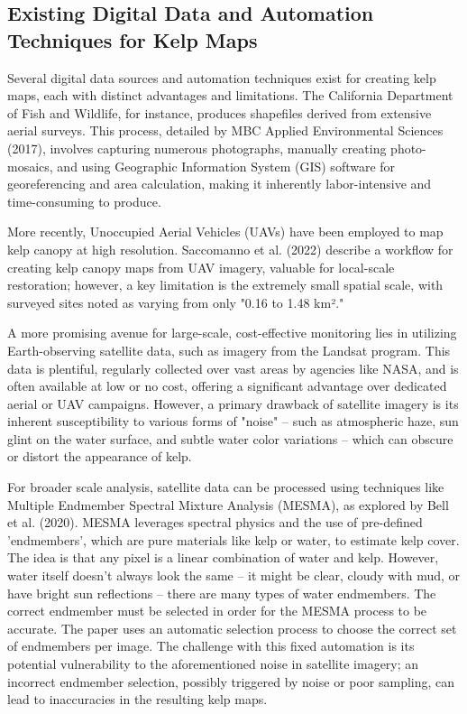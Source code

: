 \documentclass{article}
\begin{document}
\subsection{Existing Digital Data and Automation Techniques for Kelp Maps} 

Several digital data sources and automation techniques exist for creating kelp maps, each with distinct advantages and limitations. The California Department of Fish and Wildlife, for instance, produces shapefiles derived from extensive aerial surveys. This process, detailed by MBC Applied Environmental Sciences (2017), involves capturing numerous photographs, manually creating photo-mosaics, and  using Geographic Information System (GIS) software for georeferencing and area calculation, making it inherently labor-intensive and time-consuming to produce.

More recently, Unoccupied Aerial Vehicles (UAVs) have been employed to map kelp canopy at high resolution. Saccomanno et al. (2022) describe a workflow for creating kelp canopy maps from UAV imagery, valuable for local-scale restoration; however, a key limitation is the extremely small spatial scale, with surveyed sites noted as varying from only "0.16 to 1.48 km²."

A more promising avenue for large-scale, cost-effective monitoring lies in utilizing Earth-observing satellite data, such as imagery from the Landsat program. This data is plentiful, regularly collected over vast areas by agencies like NASA, and is often available at low or no cost, offering a significant advantage over dedicated aerial or UAV campaigns. However, a primary drawback of satellite imagery is its inherent susceptibility to various forms of "noise" – such as atmospheric haze, sun glint on the water surface, and subtle water color variations – which can obscure or distort the appearance of kelp. 

For broader scale analysis, satellite data can be processed using techniques like Multiple Endmember Spectral Mixture Analysis (MESMA), as explored by Bell et al. (2020). MESMA leverages spectral physics and the use of pre-defined 'endmembers', which are pure materials like kelp or water, to estimate kelp cover. The idea is that any pixel is a linear combination of water and kelp. However, water itself doesn't always look the same – it might be clear, cloudy with mud, or have bright sun reflections – there are many types of water endmembers. The correct endmember must be selected in order for the MESMA process to be accurate. The paper uses an automatic selection process to choose the correct set of endmembers per image. The challenge with this fixed automation is its potential vulnerability to the aforementioned noise in satellite imagery; an incorrect endmember selection, possibly triggered by noise or poor sampling, can lead to inaccuracies in the resulting kelp maps.
\end{document}
